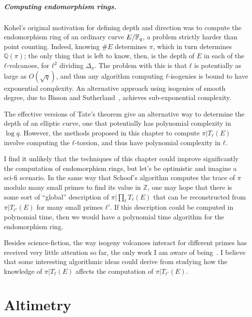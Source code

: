 \documentclass{report}
\theoremstyle{plain}
\theoremstyle{definition}
\begin{document}
\paragraph{Computing endomorphism rings.}
Kohel's original motivation for defining depth and direction was to
compute the endomorphism ring of an ordinary curve $E/\mathbb{F}_q$, a problem
strictly harder than point counting. %
Indeed, knowing $\#E$ determines $π$, which in turn determines $ℚ(π)$;
the only thing that is left to know, then, is the depth of $E$ in each
of the $ℓ$-volcanoes, for $ℓ^2$ dividing $Δ_π$. %
The problem with this is that $ℓ$ is potentially as large as
$O(\sqrt{q})$, and thus any algorithm computing $ℓ$-isogenies is bound
to have exponential complexity. %
An alternative approach using isogenies of smooth degree, due to
Bisson and Sutherland~\cite{bisson+sutherland11}, achieves
sub-exponential complexity. %

The effective versions of Tate's theorem give an alternative way to
determine the depth of an elliptic curve, one that potentially has
polynomial complexity in $\log q$. %
However, the methods proposed in this chapter to compute $π|T_ℓ(E)$
involve computing the $ℓ$-torsion, and thus have polynomial complexity
in $ℓ$. %

I find it unlikely that the techniques of this chapter could improve
significantly the computation of endomorphism rings, but let's be
optimistic and imagine a sci-fi scenario. %
In the same way that Schoof's algorithm computes the trace of $π$
modulo many small primes to find its value in $ℤ$, one may hope that
there is some sort of ``global'' description of $π|\prod_ℓT_ℓ(E)$ that
can be reconstructed from $π|T_{ℓ'}(E)$ for many small primes $ℓ'$. %
If this description could be computed in polynomial time, then we
would have a polynomial time algorithm for the endomorphism ring. %

Besides science-fiction, the way isogeny volcanoes interact for
different primes has received very little attention so far, the only
work I am aware of being~\cite{MOODY20125249}. %
I believe that some interesting algorithmic ideas could derive from
studying how the knowledge of $π|T_ℓ(E)$ affects the computation of
$π|T_{ℓ'}(E)$.




\chapter{Altimetry}
\label{cha:fpbar}
\end{document}
